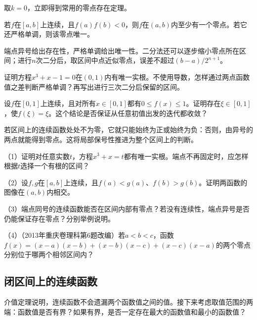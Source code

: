 取\(k=0\)，立即得到常用的零点存在定理。

\begin{corollary}[零点存在定理]\label{cor:functions-zero-existence}
若\(f\)在\([a,b]\)上连续，且\(f(a)f(b)<0\)，则\(f\)在\((a,b)\)内至少有一个零点。若它还严格单调，则该零点唯一。
\end{corollary}

端点异号给出存在性，严格单调给出唯一性。二分法还可以逐步缩小零点所在区间；进行\(n\)次二分后，取区间中点近似零点，误差不超过\((b-a)/2^{n+1}\)。

\begin{example}
证明方程\(x^3+x-1=0\)在\((0,1)\)内有唯一实根。不使用导数，怎样通过两点函数值之差判断严格单调？再写出进行三次二分后保留的区间。
\end{example}

\begin{example}
设\(f\)在\([0,1]\)上连续，且对所有\(x\in[0,1]\)都有\(0\le f(x)\le1\)。证明存在\(\xi\in[0,1]\)，使\(f(\xi)=\xi\)。这个结论是否保证从任意初值出发的迭代都收敛？
\end{example}

若区间上的连续函数处处不为零，它就只能始终为正或始终为负：否则，由异号的两点就能得到零点。这将局部保号性推进为整个区间上的判断。

\begin{exercise}
\mbox{}\par\nobreak

（1）证明对任意实数\(t\)，方程\(x^3+x=t\)都有唯一实根。端点不再固定时，应怎样根据\(t\)选择一个有根的区间？

（2）设\(f,g\)在\([a,b]\)上连续，且\(f(a)<g(a)\)、\(f(b)>g(b)\)。证明两函数的图像在\((a,b)\)内相交。

（3）端点同号的连续函数能否在区间内部有零点？若没有连续性，端点异号是否仍能保证存在零点？分别举例说明。

（4）（2013年重庆卷理科第6题改编）若\(a<b<c\)，函数\(f(x)=(x-a)(x-b)+(x-b)(x-c)+(x-c)(x-a)\)的两个零点分别位于哪两个相邻区间内？
\end{exercise}

\begingroup
\setlength{\parskip}{4pt}
\subsection{闭区间上的连续函数}
\label{subsec:functions-extreme-values}

介值定理说明，连续函数不会遗漏两个函数值之间的值。接下来考虑取值范围的两端：函数值是否有界？如果有界，是否一定存在最大的函数值和最小的函数值？

